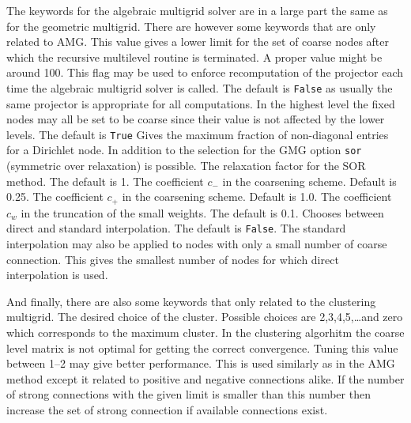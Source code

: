 The keywords for the algebraic multigrid solver are in a large part the same as
for the geometric multigrid. There are however some keywords that are only related to AMG.
\sifbegin
{}
This value gives a lower limit for the set of coarse nodes after which
the recursive multilevel routine is terminated. A proper value 
might be around 100.
This flag may be used to enforce recomputation of the projector 
each time the algebraic multigrid solver is called. The default is
\texttt{False} as usually the same projector is appropriate for all
computations.
In the highest level the fixed nodes may all be set
to be coarse since their value is not affected by the lower levels.
The default is \texttt{True}
Gives the maximum fraction of non-diagonal entries for a Dirichlet node.
In addition to the selection for the GMG option \texttt{sor} (symmetric over relaxation)
is possible. 
The relaxation factor for the SOR method. The default is 1.
The coefficient $c_{-}$ in the coarsening scheme. Default is 0.25.
The coefficient $c_{+}$ in the coarsening scheme. Default is 1.0.
The coefficient $c_w$ in the truncation of the small weights. The default is 0.1.
Chooses between direct and standard interpolation. The default is \texttt{False}.
The standard interpolation may also be applied to nodes with 
only a small number of coarse connection. This gives the smallest number
of nodes for which direct interpolation is used.
\sifend

And finally, there are also some keywords that only related to the clustering multigrid.
\sifbegin
   The desired choice of the cluster. Possible choices are 2,3,4,5,\ldots and zero which
  corresponds to the maximum cluster.
   In the clustering algorhitm the coarse level matrix is not optimal for getting 
   the correct convergence. Tuning this value between 1--2 may give better performance.
  This is used similarly as in the AMG method except it related to positive and negative
  connections alike.
  If the number of strong connections with the given limit is smaller than this number
  then increase the set of strong connection if available connections exist.
\sifend



